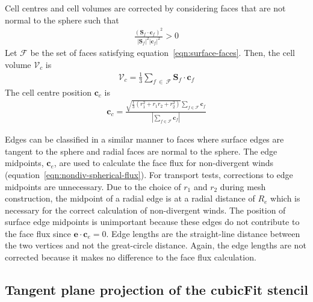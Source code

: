 Cell centres and cell volumes are corrected by considering faces that are not normal to the sphere such that
\begin{align}
	\frac{\left(\mathbf{S}_f \cdot \mathbf{c}_f\right)^2}{\left\lvert \mathbf{S}_f \right\rvert^2 \left\lvert \mathbf{c}_f \right\rvert^2} > 0 \label{eqn:surface-faces}
\end{align}
Let $\mathcal{F}$ be the set of faces satisfying equation~\eqref{eqn:surface-faces}.  Then, the cell volume $\mathcal{V}_c$ is
\begin{align}
	\mathcal{V}_c = \frac{1}{3} \sum_{f\:\in\:\mathcal{F}} \mathbf{S}_f \cdot \mathbf{c}_f
\end{align}
The cell centre position $\mathbf{c}_c$ is
\begin{align}
	\mathbf{c}_c = \frac{\sqrt{\frac{1}{3} \left(r_1^2 + r_1 r_2 + r_2^2\right)}\sum_{f\in\mathcal{F}} \mathbf{c}_f}{\left\lvert \sum_{f\in\mathcal{F}} \mathbf{c}_f \right\rvert}
\end{align}

Edges can be classified in a similar manner to faces where surface edges are tangent to the sphere and radial faces are normal to the sphere.  The edge midpoints, $\mathbf{c}_e$, are used to calculate the face flux for non-divergent winds (equation~\eqref{eqn:nondiv-spherical-flux}).
For transport tests, corrections to edge midpoints are unnecessary.  Due to the choice of $r_1$ and $r_2$ during mesh construction, the midpoint of a radial edge is at a radial distance of $R_e$ which is necessary for the correct calculation of non-divergent winds.
The position of surface edge midpoints is unimportant because these edges do not contribute to the face flux since $\mathbf{e} \cdot \mathbf{c}_e = 0$.
Edge lengths are the straight-line distance between the two vertices and not the great-circle distance.  Again, the edge lengths are not corrected because it makes no difference to the face flux calculation.

\subsection*{Tangent plane projection of the cubicFit stencil}

